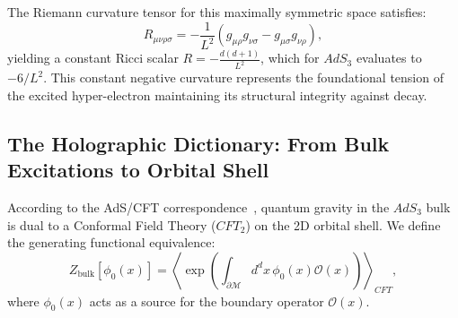 The Riemann curvature tensor for this maximally symmetric space satisfies:
\begin{equation}
    R_{\mu\nu\rho\sigma} = -\frac{1}{L^2} \left( g_{\mu\rho} g_{\nu\sigma} - g_{\mu\sigma} g_{\nu\rho} \right),
\end{equation}
yielding a constant Ricci scalar $R = -\frac{d(d+1)}{L^2}$, which for $AdS_3$ evaluates to $-6/L^2$. This constant negative curvature represents the foundational tension of the excited hyper-electron maintaining its structural integrity against decay.

\subsection{The Holographic Dictionary: From Bulk Excitations to Orbital Shell}

According to the AdS/CFT correspondence~\cite{Maldacena1997}, quantum gravity in the $AdS_3$ bulk is dual to a Conformal Field Theory ($CFT_2$) on the 2D orbital shell. We define the generating functional equivalence:
\begin{equation}
    Z_{\text{bulk}}[\phi_0(x)] = \left\langle \exp\left( \int_{\partial \mathcal{M}} d^d x \, \phi_0(x) \mathcal{O}(x) \right) \right\rangle_{CFT},
\end{equation}
where $\phi_0(x)$ acts as a source for the boundary operator $\mathcal{O}(x)$.

